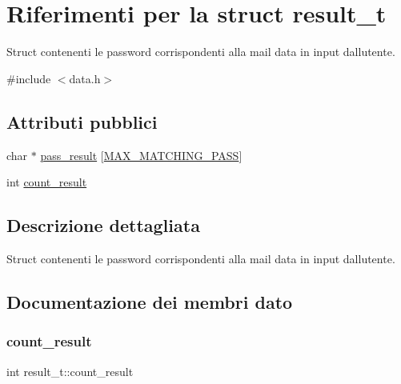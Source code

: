 \hypertarget{structresult__t}{}\section{Riferimenti per la struct result\+\_\+t}
\label{structresult__t}


Struct contenenti le password corrispondenti alla mail data in input dall\textquotesingle{}utente.  




{\ttfamily \#include $<$data.\+h$>$}

\subsection*{Attributi pubblici}
\begin{DoxyCompactItemize}
\item 
char $\ast$ \hyperlink{structresult__t_a7039c2fbcc0561cd67b3336292889669}{pass\+\_\+result} \mbox{[}\hyperlink{data_8h_a88f5ea90744f4c455d0337349a79d723}{M\+A\+X\+\_\+\+M\+A\+T\+C\+H\+I\+N\+G\+\_\+\+P\+A\+SS}\mbox{]}
\item 
int \hyperlink{structresult__t_a2a013c07b53c89347cf42f0ae98667cb}{count\+\_\+result}
\end{DoxyCompactItemize}


\subsection{Descrizione dettagliata}
Struct contenenti le password corrispondenti alla mail data in input dall\textquotesingle{}utente. 

\subsection{Documentazione dei membri dato}
\mbox{\label{structresult__t_a2a013c07b53c89347cf42f0ae98667cb}} 
\subsubsection{\texorpdfstring{count\+\_\+result}{count\_result}}
{\footnotesize\ttfamily int result\+\_\+t\+::count\+\_\+result}

\mbox{\label{structresult__t_a7039c2fbcc0561cd67b3336292889669}} 
